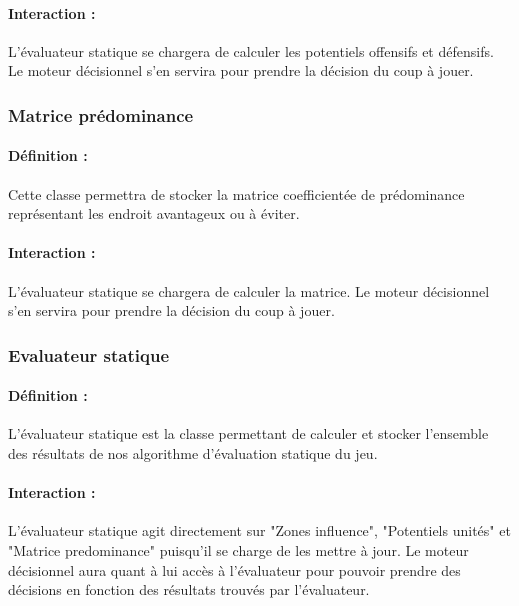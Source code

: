 \documentclass[12pt]{article}
\begin{document}
				\paragraph{Interaction :}

				L'évaluateur statique se chargera de calculer les potentiels offensifs et défensifs. Le moteur décisionnel s'en servira pour prendre la décision du coup à jouer.

			\subsubsection{Matrice prédominance}

				\paragraph{Définition :}

				Cette classe permettra de stocker la matrice coefficientée de prédominance représentant les endroit avantageux ou à éviter.

				\paragraph{Interaction :}

				L'évaluateur statique se chargera de calculer la matrice. Le moteur décisionnel s'en servira pour prendre la décision du coup à jouer.

			\subsubsection{Evaluateur statique}

				\paragraph{Définition :}

				L'évaluateur statique est la classe permettant de calculer et stocker l'ensemble des résultats de nos algorithme d'évaluation statique du jeu.

				\paragraph{Interaction :}

				L'évaluateur statique agit directement sur "Zones influence", "Potentiels unités" et "Matrice predominance" puisqu'il se charge de les mettre à jour. Le moteur décisionnel aura quant à lui accès à l'évaluateur pour pouvoir prendre des décisions en fonction des résultats trouvés par l'évaluateur.
\end{document}
